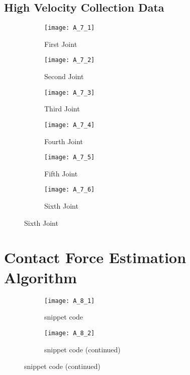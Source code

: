 \subsection*{High Velocity Collection Data}
\begin{figure}[H]
  \caption{Friction Identification}  
  \label{fig:appendix high vel fric}
  \begin{subfigure}[t]{0.5\textwidth}
    \centering
    \texttt{[image: A\_7\_1]} 
    \caption{First Joint}
  \end{subfigure}
  \begin{subfigure}[t]{0.5\textwidth}
    \centering
    \texttt{[image: A\_7\_2]}
    \caption{Second Joint}
  \end{subfigure}
  \begin{subfigure}[t]{0.5\textwidth}
    \centering
    \texttt{[image: A\_7\_3]}
    \caption{Third Joint}
  \end{subfigure}
  \begin{subfigure}[t]{0.5\textwidth}
    \centering
    \texttt{[image: A\_7\_4]}
    \caption{Fourth Joint}
  \end{subfigure}
  \begin{subfigure}[t]{0.5\textwidth}
    \centering
    \texttt{[image: A\_7\_5]}
    \caption{Fifth Joint}
  \end{subfigure}
  \begin{subfigure}[t]{0.5\textwidth}
    \centering
    \texttt{[image: A\_7\_6]}
    \caption{Sixth Joint}
  \end{subfigure}
\end{figure}

\section*{Contact Force Estimation Algorithm}
\begin{figure}[H]
  \caption{Contact Force Estimation Algorithm}  
  \label{fig:algo code}
  \begin{subfigure}[t]{\textwidth}
    \centering
    \texttt{[image: A\_8\_1]} 
    \caption{snippet code}
  \end{subfigure}
  \begin{subfigure}[t]{\textwidth}
    \centering
    \texttt{[image: A\_8\_2]}
    \caption{snippet code (continued)}
  \end{subfigure}
\end{figure}

